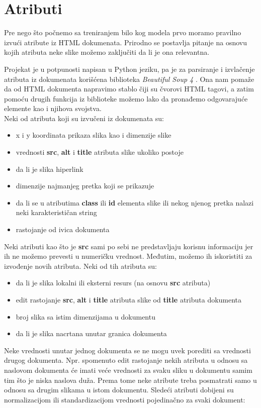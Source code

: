 \documentclass[a4paper]{article}
\begin{document}
\section{Atributi}
\label{sec:atributi}

Pre nego što počnemo sa treniranjem bilo kog modela prvo moramo pravilno izvući atribute iz HTML dokumenata. Prirodno se postavlja pitanje na osnovu kojih atributa neke slike možemo zaključiti da li je ona relevantna. 

Projekat je u potpunosti napisan u Python jeziku, pa je za parsiranje i izvlačenje atributa iz dokumenata korišćena biblioteka \textit{Beautiful Soup 4} \cite{bs4}. Ona nam pomaže da od HTML dokumenta napravimo stablo čiji su čvorovi HTML tagovi, a zatim pomoću drugih funkcija iz biblioteke možemo lako da pronađemo odgovarajuće elemente kao i njihova svojstva. \\
Neki od atributa koji su izvučeni iz dokumenata su:
\begin{itemize}
	\item x i y koordinata prikaza slika kao i dimenzije slike
	\item vrednosti \textbf{src}, \textbf{alt} i \textbf{title} atributa slike ukoliko postoje
	\item da li je slika hiperlink
	\item dimenzije najmanjeg pretka koji se prikazuje
	\item da li se u atributima \textbf{class} ili \textbf{id} elementa slike ili nekog njenog pretka nalazi neki karakterističan string
	\item rastojanje od ivica dokumenta
\end{itemize}
Neki atributi kao što je \textbf{src} sami po sebi ne predstavljaju korisnu informaciju jer ih ne možemo prevesti u numeričku vrednost. Međutim, možemo ih iskoristiti za izvođenje novih atributa. Neki od tih atributa su:
\begin{itemize}
	\item da li je slika lokalni ili eksterni resurs (na osnovu \textbf{src} atributa)
	\item edit rastojanje \textbf{src}, \textbf{alt} i \textbf{title} atributa slike od \textbf{title} atributa dokumenta
	\item broj slika sa istim dimenzijama u dokumentu
	\item da li je slika nacrtana unutar granica dokumenta
\end{itemize}
Neke vrednosti unutar jednog dokumenta se ne mogu uvek porediti sa vrednosti drugog dokumenta. Npr. spomenuto edit rastojanje nekih atributa u odnosu sa naslovom dokumenta će imati veće vrednosti za svaku sliku u dokumentu samim tim što je niska naslova duža. Prema tome neke atribute treba posmatrati samo u odnosu sa drugim slikama u istom dokumentu. Sledeći atributi dobijeni su normalizacijom ili standardizacijom vrednosti pojedinačno za svaki dokument:
\end{document}
